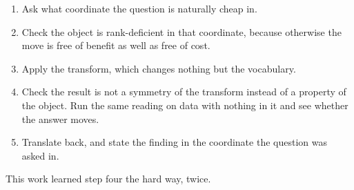 \begin{enumerate}
  \item Ask what coordinate the question is naturally cheap in.
  \item Check the object is rank-deficient in that coordinate, because otherwise the move is free of benefit as well as free of cost.
  \item Apply the transform, which changes nothing but the vocabulary.
  \item Check the result is not a symmetry of the transform instead of a property of the object. Run the same reading on data with nothing in it and see whether the answer moves.
  \item Translate back, and state the finding in the coordinate the question was asked in.
\end{enumerate}

This work learned step four the hard way, twice.
